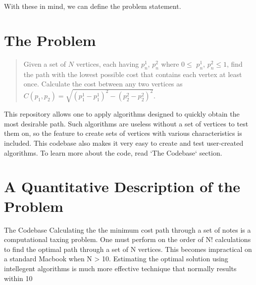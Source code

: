 \documentclass[12pt]{article}
\begin{document}
With these in mind, we can define the problem statement.


\section{The Problem}

\begin{quote}

Given a set of $N$ vertices, each having $p_n^1$, $p_n^2$ where $0 \leq$ $p_n^1$, $p_n^2 \leq 1$, find the path with the lowest possible cost that contains each vertex at least once.  Calculate the cost between any two vertices as
$ C(p_{1}, p_{2}) = \sqrt{(p_{1}^1-p_{1}^1)^2 - (p_{2}^2-p_{2}^2)^2} $.

\end{quote}







This repository allows one to apply algorithms designed to quickly obtain the most desirable path.  Such algorithms are useless without a set of vertices to test them on, so the feature to create sets of vertices with various characteristics is included.  This codebase also makes it very easy to create and test user-created algorithms.  To learn more about the code, read `The Codebase` section.



\section{A Quantitative Description of the Problem}



The Codebase
Calculating the the minimum cost path through a set of notes is a computational taxing problem.  One must perform on the order of N! calculations to find the optimal path through a set of N vertices.  This becomes impractical on a standard Macbook when N > 10.  Estimating the optimal solution using intellegent algorithms is much more effective technique that normally results within 10%
\end{document}
